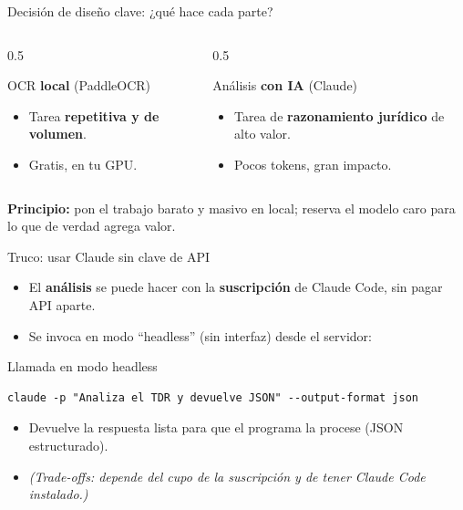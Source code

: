 \documentclass[10pt,aspectratio=169]{beamer}
\newcommand{\si}{\textcolor{ok}{\ding{51}}}
\begin{document}
\begin{frame}{Decisión de diseño clave: ¿qué hace cada parte?}
  \begin{columns}
    \begin{column}{0.5\textwidth}
      \begin{block}{OCR \textbf{local} (PaddleOCR)}
        \begin{itemize}
          \item Tarea \textbf{repetitiva y de volumen}.
          \item Gratis, en tu GPU. \si
        \end{itemize}
      \end{block}
    \end{column}
    \begin{column}{0.5\textwidth}
      \begin{block}{Análisis \textbf{con IA} (Claude)}
        \begin{itemize}
          \item Tarea de \textbf{razonamiento jurídico} de alto valor.
          \item Pocos tokens, gran impacto. \si
        \end{itemize}
      \end{block}
    \end{column}
  \end{columns}
  \vfill
  \centering
  \textbf{Principio:} pon el trabajo barato y masivo en local; reserva el modelo caro para lo que de verdad agrega valor.
\end{frame}

\begin{frame}[fragile]{Truco: usar Claude sin clave de API}
  \begin{itemize}
    \item El \textbf{análisis} se puede hacer con la \textbf{suscripción} de Claude Code, sin pagar API aparte.
    \item Se invoca en modo ``headless'' (sin interfaz) desde el servidor:
  \end{itemize}
  \begin{exampleblock}{Llamada en modo headless}
\begin{verbatim}
claude -p "Analiza el TDR y devuelve JSON" --output-format json
\end{verbatim}
  \end{exampleblock}
  \begin{itemize}
    \item Devuelve la respuesta lista para que el programa la procese (JSON estructurado).
    \item \footnotesize\emph{(Trade-offs: depende del cupo de la suscripción y de tener Claude Code instalado.)}
  \end{itemize}
\end{frame}
\end{document}
